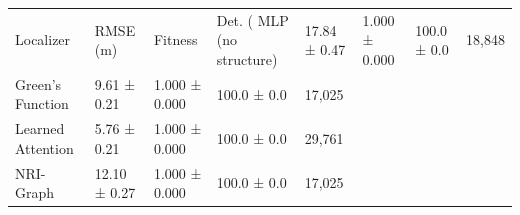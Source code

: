 \begin{tabular}{lllll}
\toprule
Localizer & RMSE (m) & Fitness & Det. (%
\midrule
MLP (no structure) & 17.84 ± 0.47 & 1.000 ± 0.000 & 100.0 ± 0.0 & 18,848 \\
Green's Function & 9.61 ± 0.21 & 1.000 ± 0.000 & 100.0 ± 0.0 & 17,025 \\
Learned Attention & 5.76 ± 0.21 & 1.000 ± 0.000 & 100.0 ± 0.0 & 29,761 \\
NRI-Graph & 12.10 ± 0.27 & 1.000 ± 0.000 & 100.0 ± 0.0 & 17,025 \\
\bottomrule
\end{tabular}

